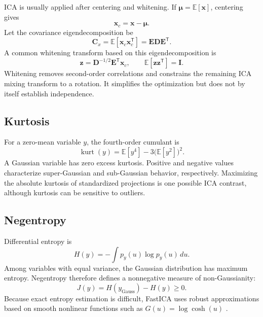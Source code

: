 \documentclass[
    paper=a4,
    fontsize=11pt,
    DIV=11,
    parskip=half,
    headings=normal,
    numbers=noendperiod,
    abstract=true,
    titlepage=true
]{scrartcl}
\begin{document}
ICA is usually applied after centering and whitening. If $\boldsymbol{\mu}=\mathbb{E}[\mathbf{x}]$, centering gives
\begin{equation}
    \mathbf{x}_c=\mathbf{x}-\boldsymbol{\mu}.
\end{equation}
Let the covariance eigendecomposition be
\begin{equation}
    \mathbf{C}_x=\mathbb{E}[\mathbf{x}_c\mathbf{x}_c^{\mathsf T}]
    =\mathbf{E}\mathbf{D}\mathbf{E}^{\mathsf T}.
\end{equation}
A common whitening transform based on this eigendecomposition is
\begin{equation}
    \mathbf{z}=\mathbf{D}^{-1/2}\mathbf{E}^{\mathsf T}\mathbf{x}_c,
    \qquad
    \mathbb{E}[\mathbf{z}\mathbf{z}^{\mathsf T}]=\mathbf{I}.
    \label{eq:whitening}
\end{equation}
Whitening removes second-order correlations and constrains the remaining ICA mixing transform to a rotation. It simplifies the optimization but does not by itself establish independence.

\subsection{Kurtosis}

For a zero-mean variable $y$, the fourth-order cumulant is
\begin{equation}
    \operatorname{kurt}(y)=\mathbb{E}[y^4]-3\bigl(\mathbb{E}[y^2]\bigr)^2.
    \label{eq:kurtosis}
\end{equation}
A Gaussian variable has zero excess kurtosis. Positive and negative values characterize super-Gaussian and sub-Gaussian behavior, respectively. Maximizing the absolute kurtosis of standardized projections is one possible ICA contrast, although kurtosis can be sensitive to outliers.

\subsection{Negentropy}

Differential entropy is
\begin{equation}
    H(y)=-\int p_y(u)\log p_y(u)\,du.
\end{equation}
Among variables with equal variance, the Gaussian distribution has maximum entropy. Negentropy therefore defines a nonnegative measure of non-Gaussianity:
\begin{equation}
    J(y)=H(y_{\mathrm{Gauss}})-H(y)\geq0.
    \label{eq:negentropy}
\end{equation}
Because exact entropy estimation is difficult, FastICA uses robust approximations based on smooth nonlinear functions such as $G(u)=\log\cosh(u)$ \cite{hyvarinen1999}.
\end{document}
